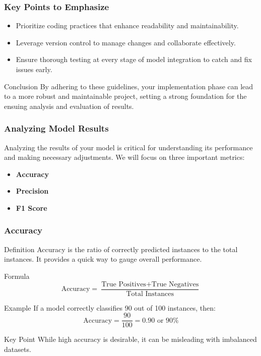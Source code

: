 \documentclass[aspectratio=169]{beamer}
\begin{document}
\begin{frame}
  \frametitle{Key Points to Emphasize}
  \begin{itemize}
    \item Prioritize coding practices that enhance readability and maintainability.
    \item Leverage version control to manage changes and collaborate effectively.
    \item Ensure thorough testing at every stage of model integration to catch and fix issues early.
  \end{itemize}

  \begin{block}{Conclusion}
    By adhering to these guidelines, your implementation phase can lead to a more robust and maintainable project, setting a strong foundation for the ensuing analysis and evaluation of results.
  \end{block}
\end{frame}

\begin{frame}[fragile]
    \frametitle{Analyzing Model Results}
    Analyzing the results of your model is critical for understanding its performance and making necessary adjustments. 
    We will focus on three important metrics:
    \begin{itemize}
        \item \textbf{Accuracy}
        \item \textbf{Precision}
        \item \textbf{F1 Score}
    \end{itemize}
\end{frame}

\begin{frame}[fragile]
    \frametitle{Accuracy}
    \begin{block}{Definition}
        Accuracy is the ratio of correctly predicted instances to the total instances. It provides a quick way to gauge overall performance.
    \end{block}
    \begin{block}{Formula}
        \begin{equation}
        \text{Accuracy} = \frac{\text{True Positives} + \text{True Negatives}}{\text{Total Instances}}
        \end{equation}
    \end{block}
    \begin{block}{Example}
        If a model correctly classifies 90 out of 100 instances, then:
        \begin{equation}
        \text{Accuracy} = \frac{90}{100} = 0.90 \text{ or } 90\%
        \end{equation}
    \end{block}
    \begin{block}{Key Point}
        While high accuracy is desirable, it can be misleading with imbalanced datasets.
    \end{block}
\end{frame}
\end{document}
